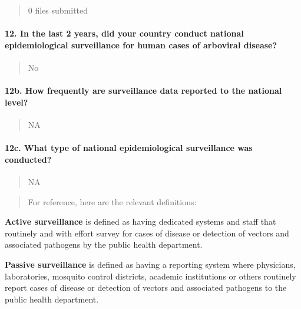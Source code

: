 \documentclass[
]{article}
\begin{document}
\begin{quote}
0 files submitted
\end{quote}

\hypertarget{in-the-last-2-years-did-your-country-conduct-national-epidemiological-surveillance-for-human-cases-of-arboviral-disease}{%
\paragraph{12. In the last 2 years, did your country conduct national
epidemiological surveillance for human cases of arboviral
disease?}\label{in-the-last-2-years-did-your-country-conduct-national-epidemiological-surveillance-for-human-cases-of-arboviral-disease}}

\begin{quote}
No
\end{quote}

\hypertarget{b.-how-frequently-are-surveillance-data-reported-to-the-national-level}{%
\paragraph{12b. How frequently are surveillance data reported to the
national
level?}\label{b.-how-frequently-are-surveillance-data-reported-to-the-national-level}}

\begin{quote}
NA
\end{quote}

\hypertarget{c.-what-type-of-national-epidemiological-surveillance-was-conducted}{%
\paragraph{12c. What type of national epidemiological surveillance was
conducted?}\label{c.-what-type-of-national-epidemiological-surveillance-was-conducted}}

\begin{quote}
NA
\end{quote}

\begin{quote}
For reference, here are the relevant definitions:
\end{quote}

\textbf{Active surveillance} is defined as having dedicated systems and
staff that routinely and with effort survey for cases of disease or
detection of vectors and associated pathogens by the public health
department.

\textbf{Passive surveillance} is defined as having a reporting system
where physicians, laboratories, mosquito control districts, academic
institutions or others routinely report cases of disease or detection of
vectors and associated pathogens to the public health department.
\end{document}
